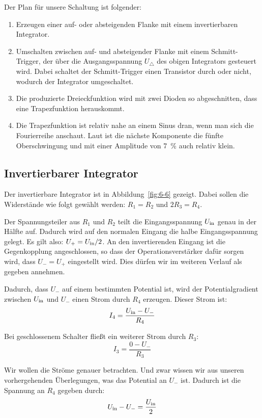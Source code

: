 Der Plan für unsere Schaltung ist folgender:
\begin{enumerate}
	\item
		Erzeugen einer auf- oder absteigenden Flanke mit einem invertierbaren
		Integrator.
	\item
		Umschalten zwischen auf- und absteigender Flanke mit einem
		Schmitt-Trigger, der über die Ausgangsspannung $U_\triangle$ des obigen
		Integrators gesteuert wird. Dabei schaltet der Schmitt-Trigger einen
		Transistor durch oder nicht, wodurch der Integrator umgeschaltet.
	\item
		Die produzierte Dreieckfunktion wird mit zwei Dioden so abgeschnitten,
		dass eine Trapezfunktion herauskommt.
	\item
		Die Trapezfunktion ist relativ nahe an einem Sinus dran, wenn man sich
		die Fourierreihe anschaut. Laut \cite[§6.1.3]{physik313-Anleitung} ist
		die nächste Komponente die fünfte Oberschwingung und mit einer
		Amplitude von \SI{7}{\percent} auch relativ klein.
\end{enumerate}

\subsection{Invertierbarer Integrator}

Der invertierbare Integrator ist in Abbildung~\ref{fig:6-6} gezeigt. Dabei
sollen die Widerstände wie folgt gewählt werden: $R_1 = R_2$ und $2 R_3 = R_4$.

Der Spannungsteiler aus $R_1$ und $R_2$ teilt die Eingangsspannung $U_\text{in}$ genau
in der Hälfte auf. Dadurch wird auf den normalen Eingang die halbe
Eingangsspannung gelegt. Es gilt also: $U_+ = U_\text{in}/2$. An den invertierenden
Eingang ist die Gegenkopplung angeschlossen, so dass der Operationsverstärker
dafür sorgen wird, dass $U_- = U_+$ eingestellt wird. Dies dürfen wir im
weiteren Verlauf als gegeben annehmen.

Dadurch, dass $U_-$ auf einem bestimmten Potential ist, wird der
Potentialgradient zwischen $U_\text{in}$ und $U_-$ einen Strom durch $R_4$ erzeugen.
Dieser Strom ist:
\[
	I_4 = \frac{U_\text{in} - U_-}{R_4}
\]

Bei geschlossenem Schalter fließt ein weiterer Strom durch $R_3$:
\[
	I_3 = \frac{0 - U_-}{R_3}
\]

Wir wollen die Ströme genauer betrachten. Und zwar wissen wir aus unseren
vorhergehenden Überlegungen, was das Potential an $U_-$ ist. Dadurch ist die
Spannung an $R_4$ gegeben durch:
\[
	U_\text{in} - U_- = \frac{U_\text{in}}2
\]

